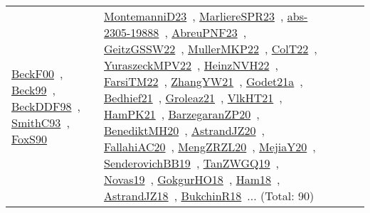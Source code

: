 {\begin{longtable}{lp{3cm}>{\raggedright\arraybackslash}p{6cm}>{\raggedright\arraybackslash}p{6cm}>{\raggedright\arraybackslash}p{8cm}}
\href{../works/BeckF00.pdf}{BeckF00}~\cite{BeckF00}, \href{../works/Beck99.pdf}{Beck99}~\cite{Beck99}, \href{../works/BeckDDF98.pdf}{BeckDDF98}~\cite{BeckDDF98}, \href{../works/SmithC93.pdf}{SmithC93}~\cite{SmithC93}, \href{../works/FoxS90.pdf}{FoxS90}~\cite{FoxS90} & \href{../works/MontemanniD23.pdf}{MontemanniD23}~\cite{MontemanniD23}, \href{../works/MarliereSPR23.pdf}{MarliereSPR23}~\cite{MarliereSPR23}, \href{../works/abs-2305-19888.pdf}{abs-2305-19888}~\cite{abs-2305-19888}, \href{../works/AbreuPNF23.pdf}{AbreuPNF23}~\cite{AbreuPNF23}, \href{../works/GeitzGSSW22.pdf}{GeitzGSSW22}~\cite{GeitzGSSW22}, \href{../works/MullerMKP22.pdf}{MullerMKP22}~\cite{MullerMKP22}, \href{../works/ColT22.pdf}{ColT22}~\cite{ColT22}, \href{../works/YuraszeckMPV22.pdf}{YuraszeckMPV22}~\cite{YuraszeckMPV22}, \href{../works/HeinzNVH22.pdf}{HeinzNVH22}~\cite{HeinzNVH22}, \href{../works/FarsiTM22.pdf}{FarsiTM22}~\cite{FarsiTM22}, \href{../works/ZhangYW21.pdf}{ZhangYW21}~\cite{ZhangYW21}, \href{../works/Godet21a.pdf}{Godet21a}~\cite{Godet21a}, \href{../works/Bedhief21.pdf}{Bedhief21}~\cite{Bedhief21}, \href{../works/Groleaz21.pdf}{Groleaz21}~\cite{Groleaz21}, \href{../works/VlkHT21.pdf}{VlkHT21}~\cite{VlkHT21}, \href{../works/HamPK21.pdf}{HamPK21}~\cite{HamPK21}, \href{../works/BarzegaranZP20.pdf}{BarzegaranZP20}~\cite{BarzegaranZP20}, \href{../works/BenediktMH20.pdf}{BenediktMH20}~\cite{BenediktMH20}, \href{../works/AstrandJZ20.pdf}{AstrandJZ20}~\cite{AstrandJZ20}, \href{../works/FallahiAC20.pdf}{FallahiAC20}~\cite{FallahiAC20}, \href{../works/MengZRZL20.pdf}{MengZRZL20}~\cite{MengZRZL20}, \href{../works/MejiaY20.pdf}{MejiaY20}~\cite{MejiaY20}, \href{../works/SenderovichBB19.pdf}{SenderovichBB19}~\cite{SenderovichBB19}, \href{../works/TanZWGQ19.pdf}{TanZWGQ19}~\cite{TanZWGQ19}, \href{../works/Novas19.pdf}{Novas19}~\cite{Novas19}, \href{../works/GokgurHO18.pdf}{GokgurHO18}~\cite{GokgurHO18}, \href{../works/Ham18.pdf}{Ham18}~\cite{Ham18}, \href{../works/AstrandJZ18.pdf}{AstrandJZ18}~\cite{AstrandJZ18}, \href{../works/BukchinR18.pdf}{BukchinR18}~\cite{BukchinR18}... (Total: 90)\\

\end{longtable}}
